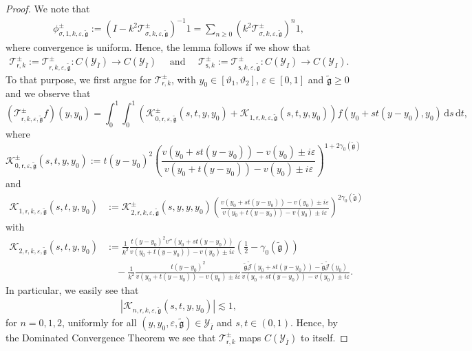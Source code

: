 \documentclass[11pt,reqno]{amsproc}
\theoremstyle{definition}
\numberwithin{equation}{section}
\newcommand{\cJ}{{\mathcal{J}}}
\newcommand{\sr}{{\mathsf{r}}}
\newcommand{\s}{{\mathsf{s}}}
\newcommand{\cT}{{\mathcal T}}
\renewcommand{\d}{\mathrm{d}}
\newcommand{\ep}{\varepsilon}
\newcommand{\g}{{\mathfrak{g}}}
\begin{document}
\begin{proof}
We note that
\begin{align*}
\phi_{\sigma,1,k,\ep,\tilde\g}^\pm := (I- k^2 \cT_{\sigma,k,\ep,\tilde\g}^\pm)^{-1} 1 = \sum_{n\geq 0}  \left(k^2 \cT_{\sigma,k,\ep,\tilde\g}^\pm\right)^n 1,
\end{align*}
where convergence is uniform. Hence, the lemma follows if we show that
\begin{align*}
\cT_{\sr,k}^\pm :=\cT_{\sr,k,\ep,\tilde\g}^\pm : C(\mathcal{Y}_{\overline{I}} ) \rightarrow C(\mathcal{Y}_{\overline{I}} ) \quad \text{ and }\quad  \cT_{\s,k}^\pm :=\cT_{\s,k,\ep,\tilde\g}^\pm : C(\mathcal{Y}_{{I}} ) \rightarrow C(\mathcal{Y}_{{I}} ).
\end{align*}
To that purpose, we first argue for $\cT_{\sr,k}^\pm$, with $y_0\in [\vartheta_1,\vartheta_2]$, $\ep\in[0,1]$ and $\tilde\g\geq 0$ and we observe that
\begin{equation*}
\left( \cT_{\sr, k,\ep,\tilde\g}^\pm f\right) (y,y_0) = \int_0^1\int_0^1 \left( \mathcal{K}_{0,\sr,\ep,\tilde\g}^\pm(s,t,y,y_0) + \mathcal{K}_{1,\sr,k,\ep,\tilde\g}(s,t,y,y_0) \right)f(y_0 + st(y-y_0),y_0) \,\d s\, \d t,
\end{equation*}
where
\begin{equation*}
\mathcal{K}_{0,\sr,\ep,\tilde\g}^\pm(s,t,y,y_0)  := t(y-y_0)^2\left( \frac{v(y_0 + st(y-y_0)) - v(y_0) \pm i\ep}{v(y_0 + t(y-y_0)) - v(y_0) \pm i\ep}\right)^{1+2\gamma_0(\tilde\g)}
\end{equation*}
and
\begin{align*}
\mathcal{K}_{1,\sr,k,\ep,\tilde\g}(s,t,y,y_0) &:= \mathcal{K}_{2,\sr,k,\ep,\tilde\g}^\pm(s,y,y,y_0) \left( \frac{v(y_0 + st(y-y_0)) - v(y_0) \pm i\ep}{v(y_0 + t(y-y_0)) - v(y_0) \pm i\ep}\right)^{2\gamma_0(\tilde\g)}  
\end{align*}
with
\begin{align*}
\mathcal{K}_{2,\sr,k,\ep,\tilde\g}(s,t,y,y_0) &:= \frac{1}{k^2} \frac{t(y-y_0)^2 v''(y_0+st(y-y_0))}{v(y_0+t(y-y_0)) - v(y_0)\pm i\ep}\left( \frac12 - \gamma_0(\tilde\g)\right)  \\
&\quad -\frac{1}{k^2} \frac{t(y-y_0)^2}{v(y_0 + t(y-y_0)) - v(y_0) \pm i\ep} \frac{  \tilde\g\widetilde\cJ(y_0+st(y-y_0)) - \tilde\g\widetilde\cJ(y_0)}{v(y_0 + st(y-y_0)) - v(y_0) \pm i\ep}. 
\end{align*}
In particular, we easily see that 
\begin{align*}
\left| \mathcal{K}_{n,\sr,k,\ep,\tilde\g}(s,t,y,y_0) \right| \lesssim 1,
\end{align*}
for $n=0,1,2$, uniformly for all $(y,y_0,\ep,\tilde\g)\in \mathcal{Y}_{\overline{I}}$ and $s,t\in (0,1)$. Hence, by the Dominated Convergence Theorem we see that $\cT_{\sr,k}^\pm$ maps $C(\mathcal{Y}_{\overline{I}} ) $ to itself.


\end{proof}
\end{document}
